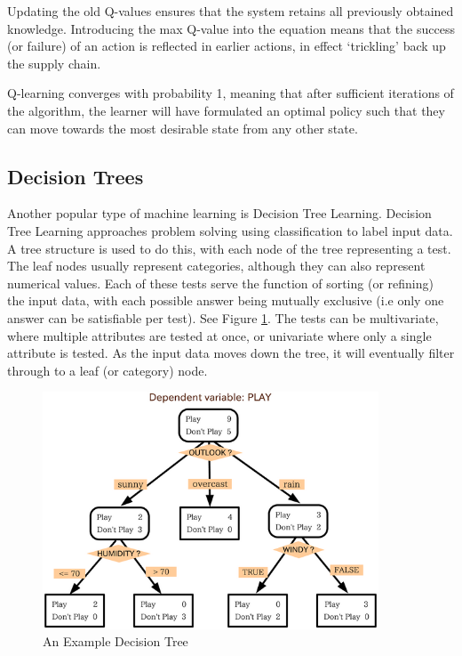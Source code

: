 \documentclass[a4paper,oneside]{report}
\begin{document}
Updating the old Q-values ensures that the system retains all previously obtained knowledge. Introducing the max Q-value into the equation means that the success (or failure) of an action is reflected in earlier actions, in effect `trickling' back up the supply chain.

Q-learning converges with probability 1, meaning that after sufficient iterations of the algorithm, the learner will have formulated an optimal policy such that they can move towards the most desirable state from any other state.

\subsection{Decision Trees}

Another popular type of machine learning is Decision Tree Learning. Decision Tree Learning approaches problem solving using classification to label input data. A tree structure is used to do this, with each node of the tree representing a test. The leaf nodes usually represent categories, although they can also represent numerical values. Each of these tests serve the function of sorting (or refining) the input data, with each possible answer being mutually exclusive (i.e only one answer can be satisfiable per test). See Figure \ref{fig:DecisionTree}. The tests can be multivariate, where multiple attributes are tested at once, or univariate where only a single attribute is tested. As the input data moves down the tree, it will eventually filter through to a leaf (or category) node. 

\begin{figure}[h!]
	\centering
		\includegraphics[width=100mm]{sources/images/DecisionTree}
    	\caption{An Example Decision Tree \cite{Koboldt:kx}}
    	\label{fig:DecisionTree}
\end{figure}
\end{document}
